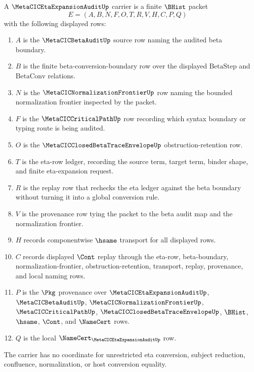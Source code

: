 \begin{definition}
\label{def:metacic-eta-expansion-audit-carrier}
A $\MetaCICEtaExpansionAuditUp$ carrier is a finite $\BHist$ packet
$$
E=(A,B,N,F,O,T,R,V,H,C,P,Q)
$$
with the following displayed rows:
\begin{enumerate}
\item $A$ is the $\MetaCICBetaAuditUp$ source row naming the audited beta
boundary.
\item $B$ is the finite beta-conversion-boundary row over the displayed
$\mathrm{BetaStep}$ and $\mathrm{BetaConv}$ relations.
\item $N$ is the $\MetaCICNormalizationFrontierUp$ row naming the bounded
normalization frontier inspected by the packet.
\item $F$ is the $\MetaCICCriticalPathUp$ row recording which syntax boundary or
typing route is being audited.
\item $O$ is the $\MetaCICClosedBetaTraceEnvelopeUp$ obstruction-retention row.
\item $T$ is the eta-row ledger, recording the source term, target term, binder
shape, and finite eta-expansion request.
\item $R$ is the replay row that rechecks the eta ledger against the beta
boundary without turning it into a global conversion rule.
\item $V$ is the provenance row tying the packet to the beta audit map and the
normalization frontier.
\item $H$ records componentwise $\hsame$ transport for all displayed rows.
\item $C$ records displayed $\Cont$ replay through the eta-row,
beta-boundary, normalization-frontier, obstruction-retention, transport,
replay, provenance, and local naming rows.
\item $P$ is the $\Pkg$ provenance over $\MetaCICEtaExpansionAuditUp$,
$\MetaCICBetaAuditUp$, $\MetaCICNormalizationFrontierUp$,
$\MetaCICCriticalPathUp$, $\MetaCICClosedBetaTraceEnvelopeUp$, $\BHist$,
$\hsame$, $\Cont$, and $\NameCert$ rows.
\item $Q$ is the local $\NameCert_{\MetaCICEtaExpansionAuditUp}$ row.
\end{enumerate}
The carrier has no coordinate for unrestricted eta conversion, subject
reduction, confluence, normalization, or host conversion equality.
\end{definition}

